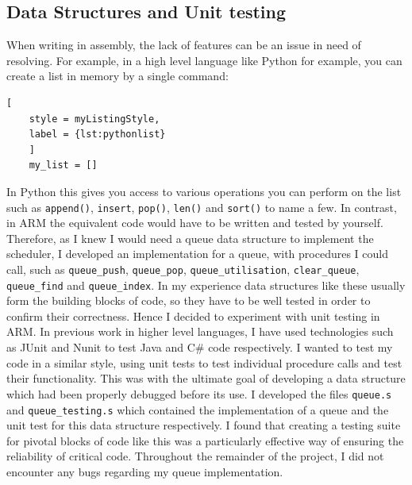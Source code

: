\subsection{Data Structures and Unit testing}
When writing in assembly, the lack of features can be an issue in need of resolving. For example, in a high level language like Python for example, you can create a list in memory by a single command: 


\begin{lstlisting}[
	style = myListingStyle,
	label = {lst:pythonlist}
	]
	my_list = []
\end{lstlisting}

In Python this gives you access to various operations you can perform on the list such as \verb|append()|, \verb|insert|, \verb|pop()|, \verb|len()| and  \verb|sort()| to name a few. In contrast, in ARM the equivalent code would have to be written and tested by yourself. Therefore, as I knew I would need a queue data structure to implement the scheduler, I developed an implementation for a queue, with procedures I could call,
 such as \verb|queue_push|, \verb|queue_pop|, \verb|queue_utilisation|, \verb|clear_queue|, \verb|queue_find| and \verb|queue_index|. In my experience data structures like these usually form the building blocks of code, so they have to be well tested in order to confirm their correctness. Hence I decided to experiment with unit testing in ARM. In previous work in higher level languages, I have used technologies such as JUnit \cite{junit} and Nunit \cite{nunit} to test Java \cite{java} and C\# \cite{csharp} code respectively.  I wanted to test my code in a similar style, using unit tests to test individual procedure calls and test their functionality. This was with the ultimate goal of developing a data structure which had been properly debugged before its use. I developed the files \verb|queue.s| and \verb|queue_testing.s| which contained the implementation of a queue and the unit test for this data structure respectively. I found that creating a testing suite for pivotal blocks of code like this was a particularly effective way of ensuring the reliability of critical code. Throughout the remainder of the project, I did not encounter any bugs regarding my queue implementation. 



